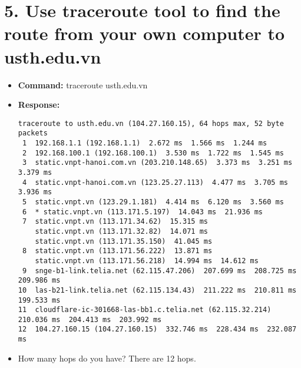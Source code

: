 \documentclass[11pt, oneside]{report}
\begin{document}
\section*{5. Use traceroute tool to find the route from your own computer to usth.edu.vn}
\begin{itemize} 
\item \textbf{Command:} traceroute usth.edu.vn
\item \textbf{Response:}
\begin{lstlisting}
traceroute to usth.edu.vn (104.27.160.15), 64 hops max, 52 byte packets
 1  192.168.1.1 (192.168.1.1)  2.672 ms  1.566 ms  1.244 ms
 2  192.168.100.1 (192.168.100.1)  3.530 ms  1.722 ms  1.545 ms
 3  static.vnpt-hanoi.com.vn (203.210.148.65)  3.373 ms  3.251 ms  3.379 ms
 4  static.vnpt-hanoi.com.vn (123.25.27.113)  4.477 ms  3.705 ms  3.936 ms
 5  static.vnpt.vn (123.29.1.181)  4.414 ms  6.120 ms  3.560 ms
 6  * static.vnpt.vn (113.171.5.197)  14.043 ms  21.936 ms
 7  static.vnpt.vn (113.171.34.62)  15.315 ms
    static.vnpt.vn (113.171.32.82)  14.071 ms
    static.vnpt.vn (113.171.35.150)  41.045 ms
 8  static.vnpt.vn (113.171.56.222)  13.871 ms
    static.vnpt.vn (113.171.56.218)  14.994 ms  14.612 ms
 9  snge-b1-link.telia.net (62.115.47.206)  207.699 ms  208.725 ms  209.986 ms
10  las-b21-link.telia.net (62.115.134.43)  211.222 ms  210.811 ms  199.533 ms
11  cloudflare-ic-301668-las-bb1.c.telia.net (62.115.32.214)  210.036 ms  204.413 ms  203.992 ms
12  104.27.160.15 (104.27.160.15)  332.746 ms  228.434 ms  232.087 ms
\end{lstlisting}
\item How many hops do you have? There are 12 hops.
\end{itemize}
\end{document}
